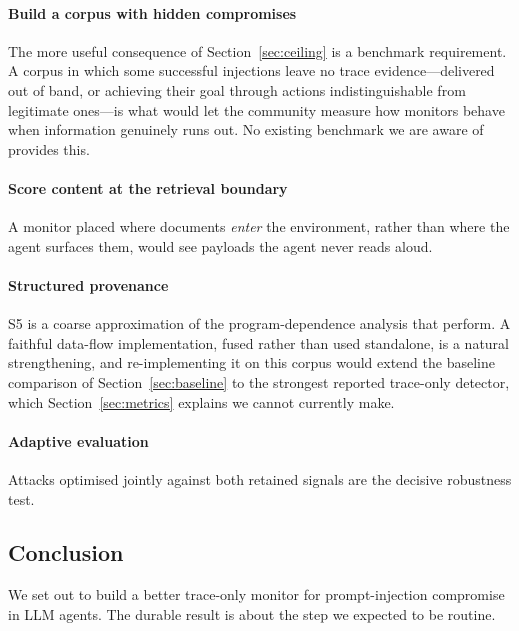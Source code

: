 \documentclass[pdflatex,sn-basic]{sn-jnl}%
\theoremstyle{thmstyleone}
\theoremstyle{thmstyletwo}
\theoremstyle{thmstylethree}
\begin{document}
\paragraph{Build a corpus with hidden compromises} The more useful consequence of
Section~\ref{sec:ceiling} is a benchmark requirement. A corpus in which some
successful injections leave no trace evidence---delivered out of band, or achieving
their goal through actions indistinguishable from legitimate ones---is what would
let the community measure how monitors behave when information genuinely runs out.
No existing benchmark we are aware of provides this.

\paragraph{Score content at the retrieval boundary} A monitor placed where
documents \emph{enter} the environment, rather than where the agent surfaces them,
would see payloads the agent never reads aloud.

\paragraph{Structured provenance} S5 is a coarse approximation of the
program-dependence analysis that \citet{wang2025agentarmor} perform. A faithful
data-flow implementation, fused rather than used standalone, is a natural
strengthening, and re-implementing it on this corpus would extend the baseline
comparison of Section~\ref{sec:baseline} to the strongest reported trace-only
detector, which Section~\ref{sec:metrics} explains we cannot currently make.

\paragraph{Adaptive evaluation} Attacks optimised jointly against both
retained signals are the decisive robustness test.

\subsection{Conclusion}\label{sec:conclusion}

We set out to build a better trace-only monitor for prompt-injection compromise in
LLM agents. The durable result is about the step we expected to be routine.
\end{document}
